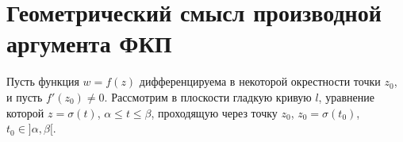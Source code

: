 \documentclass[a4paper, 12pt]{report}
\begin{document}
\section{Геометрический смысл производной аргумента ФКП}
Пусть функция $w = f(z)$ дифференцируема в некоторой окрестности точки $z_0$, и пусть $f'(z_0) \not= 0$. Рассмотрим в плоскости гладкую кривую $l$, уравнение которой $z = \sigma (t)$, $\alpha \le t \le \beta$, проходящую через точку $z_0$, $z_0 = \sigma(t_0)$, $t_0 \in ]\alpha, \beta[$.
\begin{figure}[bh]
\begin{minipage}[t]{0.32\linewidth}
\end{minipage}
\hfill
\begin{minipage}[t]{0.32\linewidth}

\end{minipage}
\end{figure}
\end{document}
